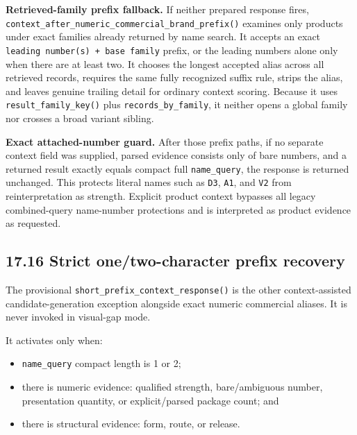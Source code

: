\textbf{Retrieved-family prefix fallback.} If neither prepared response fires, \texttt{context\_\allowbreak{}after\_\allowbreak{}numeric\_\allowbreak{}commercial\_\allowbreak{}brand\_\allowbreak{}prefix()} examines only products under exact families already returned by name search. It accepts an exact \texttt{leading\ number(s)\ +\ base\ family} prefix, or the leading numbers alone only when there are at least two. It chooses the longest accepted alias across all retrieved records, requires the same fully recognized suffix rule, strips the alias, and leaves genuine trailing detail for ordinary context scoring. Because it uses \texttt{result\_\allowbreak{}family\_\allowbreak{}key()} plus \texttt{records\_\allowbreak{}by\_\allowbreak{}family}, it neither opens a global family nor crosses a broad variant sibling.

\textbf{Exact attached-number guard.} After those prefix paths, if no separate context field was supplied, parsed evidence consists only of bare numbers, and a returned result exactly equals compact full \texttt{name\_\allowbreak{}query}, the response is returned unchanged. This protects literal names such as \texttt{D3}, \texttt{A1}, and \texttt{V2} from reinterpretation as strength. Explicit product context bypasses all legacy combined-query name-number protections and is interpreted as product evidence as requested.

\subsection{17.16 Strict one/two-character prefix recovery}\label{1716-strict-onetwo-character-prefix-recovery}

The provisional \texttt{short\_\allowbreak{}prefix\_\allowbreak{}context\_\allowbreak{}response()} is the other context-assisted candidate-generation exception alongside exact numeric commercial aliases. It is never invoked in visual-gap mode.

It activates only when:

\begin{itemize}
\tightlist
\item
  \texttt{name\_\allowbreak{}query} compact length is 1 or 2;
\item
  there is numeric evidence: qualified strength, bare/ambiguous number, presentation quantity, or explicit/parsed package count; and
\item
  there is structural evidence: form, route, or release.
\end{itemize}

